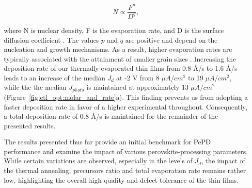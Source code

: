 \begin{equation}
    N \propto \frac{F^p}{D^q}, 
\end{equation}

where N is nuclear density, F is the evaporation rate, and D is the surface diffusion coefficient \cite{Dong2023GrowthFilm}. The values $p$ and $q$ are positive and depend on the nucleation and growth mechanisms. As a result, higher evaporation rates are typically associated with the attainment of smaller grain sizes \cite{Dong2023GrowthFilm, Du2022ThermalOutlook, Shin2020ModulationDiodes}. Increasing the deposition rate of our thermally evaporated  thin films from 0.8 \AA/s to 1.6 \AA/s leads to an increase of the median $J_d$ at -2 V from 8 $\mu A/cm^2$ to 19 $\mu A/cm^2$, while the the median $J_{photo}$ is maintained at approximately  13 $\mu A/cm^2$ (Figure~\ref{fig:etl_opt:molar_and_rate}a). This finding prevents us from adopting a faster deposition rate in favor of a higher experimental throughout. Consequently, a total deposition rate of 0.8 \AA/s is maintained for the remainder of the presented results. 




The results presented thus far provide an initial benchmark for PePD performance and examine the impact of various perovskite-processing parameters. While certain variations are observed, especially in the levels of $J_d$, the impact of the thermal annealing, precursors ratio and total evaporation rate remains rather low, highlighting the overall high quality and defect tolerance of the  thin films. 

